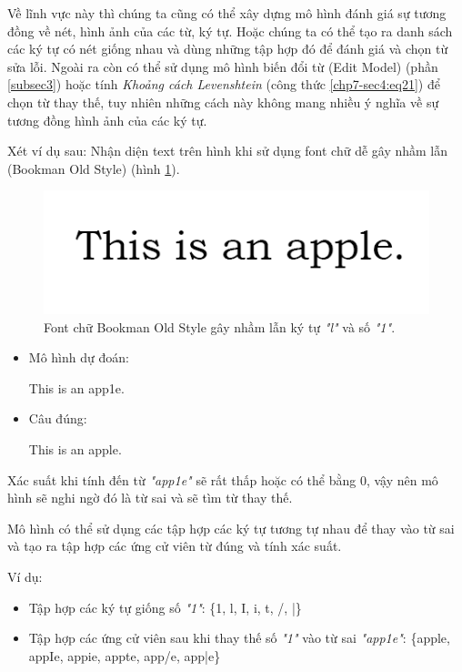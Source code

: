Về lĩnh vực này thì chúng ta cũng có thể xây dựng mô hình đánh giá sự tương đồng về nét, hình ảnh của các từ, ký tự. Hoặc chúng ta có thể tạo ra danh sách các ký tự có nét giống nhau và dùng những tập hợp đó để đánh giá và chọn từ sửa lỗi. Ngoài ra còn có thể sử dụng mô hình biến đổi từ (Edit Model) (phần \ref{subsec3}) hoặc tính \textit{Khoảng cách Levenshtein} (công thức \ref{chp7-sec4:eq21}) để chọn từ thay thế, tuy nhiên những cách này không mang nhiều ý nghĩa về sự tương đồng hình ảnh của các ký tự.

Xét ví dụ sau: Nhận diện text trên hình khi sử dụng font chữ dễ gây nhầm lẫn (Bookman Old Style) (hình \ref{fig:bookmanoldstyle}).
\begin{figure}[H]
	\centering
		\includegraphics[width=0.5\columnwidth]{chapter07/figure-sec4/bookman old style.png}
		\centering
	\caption{Font chữ Bookman Old Style gây nhầm lẫn ký tự \textit{"l"} và số \textit{"1"}.}
	\label{fig:bookmanoldstyle}
\end{figure}

\begin{itemize}
    \item Mô hình dự đoán:
    \begin{center}
    This is an app1e.
    \end{center}
    \item Câu đúng:
    \begin{center}
    This is an apple.
    \end{center}
\end{itemize}

Xác suất khi tính đến từ \textit{"app1e"} sẽ rất thấp hoặc có thể bằng 0, vậy nên mô hình sẽ nghi ngờ đó là từ sai và sẽ tìm từ thay thế.

Mô hình có thể sử dụng các tập hợp các ký tự tương tự nhau để thay vào từ sai và tạo ra tập hợp các ứng cử viên từ đúng và tính xác suất.

Ví dụ:
\begin{itemize}
    \item Tập hợp các ký tự giống số \textit{"1"}: \{1, l, I, i, t, /, |\}
    \item Tập hợp các ứng cử viên sau khi thay thế số \textit{"1"} vào từ sai \textit{"app1e"}: \{apple, appIe, appie, appte, app/e, app|e\}
\end{itemize}

